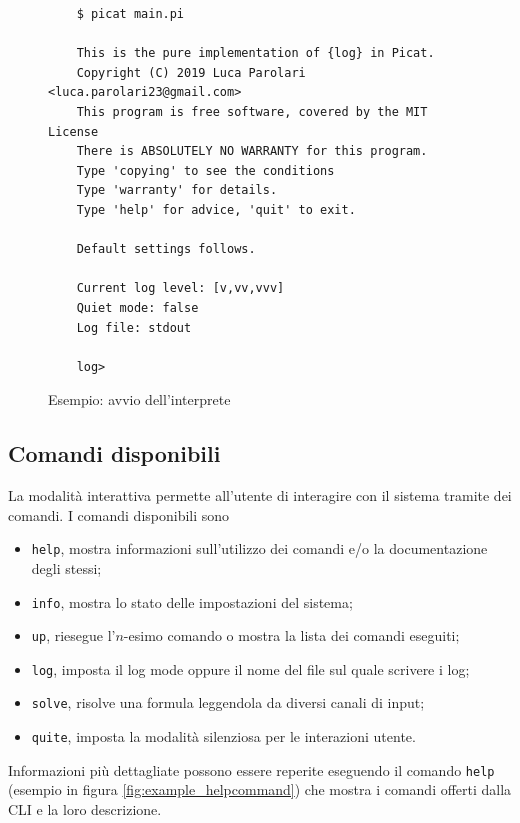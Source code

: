 \documentclass[12pt,a4paper,openright]{book} %
\begin{document}
\begin{figure}
	\begin{verbatim}
	$ picat main.pi

	This is the pure implementation of {log} in Picat.
	Copyright (C) 2019 Luca Parolari <luca.parolari23@gmail.com>
	This program is free software, covered by the MIT License
	There is ABSOLUTELY NO WARRANTY for this program.
	Type 'copying' to see the conditions
	Type 'warranty' for details.
	Type 'help' for advice, 'quit' to exit.

	Default settings follows.

	Current log level: [v,vv,vvv]
	Quiet mode: false
	Log file: stdout

	log>
	\end{verbatim}
	\caption{Esempio: avvio dell'interprete}
	\label{fig:example_interpreterstart}
\end{figure}

\subsection{Comandi disponibili}

La modalità interattiva permette all'utente di interagire con il
sistema tramite dei comandi. I comandi disponibili sono
\begin{itemize}
	\item \texttt{help}, mostra informazioni sull'utilizzo dei
          comandi e/o la documentazione degli stessi;
	\item \texttt{info}, mostra lo stato delle impostazioni del
          sistema;
	\item \texttt{up}, riesegue l'$n$-esimo comando o mostra la
          lista dei comandi eseguiti;
	\item \texttt{log}, imposta il log mode oppure il nome del
          file sul quale scrivere i log;
	\item \texttt{solve}, risolve una formula leggendola da
          diversi canali di input;
	\item \texttt{quite}, imposta la modalità silenziosa per le
          interazioni utente.
\end{itemize}

Informazioni più dettagliate possono essere reperite eseguendo il
comando \texttt{help} (esempio in figura
\ref{fig:example_helpcommand}) che mostra i comandi offerti dalla CLI
e la loro descrizione.
\end{document}
